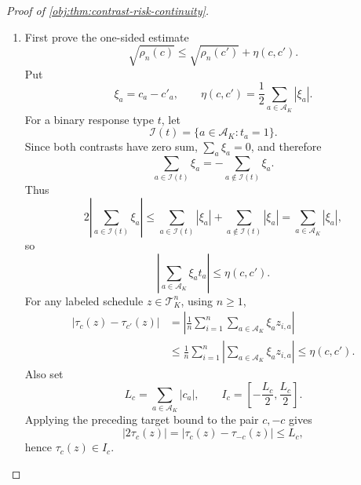 \begin{proof}[Proof of \cref{obj:thm:contrast-risk-continuity}]
\begin{enumerate}
\item First prove the one-sided estimate
\[
\sqrt{\rho_n(c)}\le \sqrt{\rho_n(c')}+\eta(c,c').
\]
Put
\[
\xi_a=c_a-c'_a,\qquad
\eta(c,c')=\frac12\sum_{a\in\mathcal A_K}|\xi_a|.
\]
For a binary response type \(t\), let
\[
\mathcal I(t)=\{a\in\mathcal A_K:t_a=1\}.
\]
Since both contrasts have zero sum, \(\sum_a \xi_a=0\), and therefore
\[
\sum_{a\in\mathcal I(t)}\xi_a
=
-\sum_{a\notin\mathcal I(t)}\xi_a .
\]
Thus
\[
2\left|\sum_{a\in\mathcal I(t)}\xi_a\right|
\le
\sum_{a\in\mathcal I(t)}|\xi_a|
+
\sum_{a\notin\mathcal I(t)}|\xi_a|
=
\sum_{a\in\mathcal A_K}|\xi_a|,
\]
so
\[
\left|\sum_{a\in\mathcal A_K}\xi_a t_a\right|
\le \eta(c,c').
\]
For any labeled schedule \(z\in\mathcal T_K^n\), using \(n\ge1\),
\[
\begin{aligned}
|\tau_c(z)-\tau_{c'}(z)|
&=
\left|\frac1n\sum_{i=1}^n\sum_{a\in\mathcal A_K}\xi_a z_{i,a}\right|  \\
&\le
\frac1n\sum_{i=1}^n
\left|\sum_{a\in\mathcal A_K}\xi_a z_{i,a}\right|
\le
\eta(c,c').
\end{aligned}
\]
Also set
\[
L_c=\sum_{a\in\mathcal A_K}|c_a|,
\qquad
I_c=\left[-\frac{L_c}{2},\frac{L_c}{2}\right].
\]
Applying the preceding target bound to the pair \(c,-c\) gives
\[
|2\tau_c(z)|=|\tau_c(z)-\tau_{-c}(z)|\le L_c,
\]
hence \(\tau_c(z)\in I_c\).


\end{enumerate}
\end{proof}
